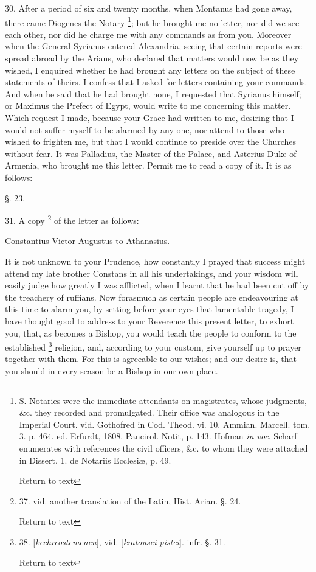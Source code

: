 30. After a period of six and twenty months, when Montanus had gone
away, there came Diogenes the Notary \footnote{S. Notaries were the immediate attendants on magistrates, whose
judgments, \&c. they recorded and promulgated. Their office was
analogous in the Imperial Court. vid. Gothofred in Cod. Theod. vi. 10.
Ammian. Marcell. tom. 3. p. 464. ed. Erfurdt, 1808. Pancirol. Notit,
p. 143. Hofman \emph{in
voc}.
Scharf enumerates with references the civil officers, \&c. to whom
they were attached in Dissert. 1. de Notariis Ecclesiæ, p. 49.

Return to text}; but he brought me no letter, nor did we see each other, nor
did he charge me with any commands as from you. Moreover when the
General Syrianus entered Alexandria, seeing that certain reports were
spread abroad by the Arians, who declared that matters would now be as
they wished, I enquired whether he had brought any letters on the
subject of these statements of theirs. I confess that I asked for
letters containing your commands. And when he said that he had brought
none, I requested that Syrianus himself; or Maximus the Prefect of
Egypt, would write to me concerning this matter. Which request I made,
because your Grace had written to me, desiring that I would not
suffer myself to be alarmed by any one, nor attend to those who wished
to frighten me, but that I would continue to preside over the Churches
without fear. It was Palladius, the Master of the Palace, and Asterius
Duke of Armenia, who brought me this letter. Permit me to read a copy
of it. It is as follows:

§. 23.

31. A copy \footnote{37. vid. another translation of the Latin, Hist. Arian. §. 24.

Return to text} of the
letter as follows:

Constantius Victor Augustus to Athanasius.

It is not unknown to your Prudence, how constantly I prayed that success
might attend my late brother Constans in all his undertakings, and
your wisdom will easily judge how greatly I was afflicted, when I
learnt that he had been cut off by the treachery of ruffians. Now
forasmuch as certain people are endeavouring at this time to alarm
you, by setting before your eyes that lamentable tragedy, I have
thought good to address to your Reverence this present letter, to
exhort you, that, as becomes a Bishop, you would teach the people to
conform to the established \footnote{38. [\emph{kechre\={o}st\={e}men\={e}n}],
vid. [\emph{kratous\={e}i
pistei}]. infr. §. 31.

Return to text} religion, and, according to your custom, give yourself up to
prayer together with them. For this is agreeable to our wishes; and
our desire is, that you should in every season be a Bishop in our own
place.

